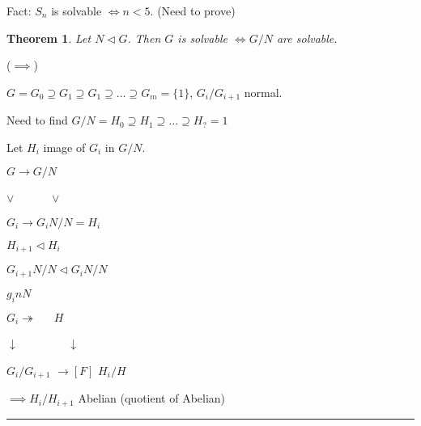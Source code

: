 \documentclass[twoside]{article}
\newcounter{lecnum}
\newcommand{\ra}{\rightarrow}
\newtheorem{theorem}{Theorem}[lecnum]
\newenvironment{proof}{{\bf Proof:}}{\hfill\rule{2mm}{2mm}}
\begin{document}
Fact: $S_n$ is solvable $\iff n < 5$. (Need to prove)

\begin{theorem}
    Let $N \triangleleft G$. Then $G$ is solvable $\iff G/N$ are solvable. 
\end{theorem}
\begin{proof}
    ($\implies$)

    $G = G_0 \supseteq G_1 \supseteq G_1 \supseteq \dots \supseteq G_m = \{1\}$, $G_i/G_{i+1}$ normal. 

    Need to find $G/N = H_0 \supseteq H_1 \supseteq \dots \supseteq H_? = 1$

    Let $H_i$ image of $G_i$ in $G/N$. 

    \newpage
        $G \ra G/N$
        
        $\vee$ \ \ \ \  \ \  $\vee$

        $G_i \ra G_iN/N = H_i$ 

        $H_{i+1} \triangleleft H_{i}$

        $G_{i+1}N/N \triangleleft G_iN/N$

        $g_inN$

    $G_i \twoheadrightarrow \ \ \ \  \ \ \ H$ 

    $\downarrow$ \ \ \ \ \ \ \ \     $\downarrow$ 
    
    $G_i/G_{i+1}$          $\rightarrow[F]$          $H_i/H$

    $\implies H_i/H_{i+1}$ Abelian (quotient of Abelian)

\end{proof}
\end{document}
